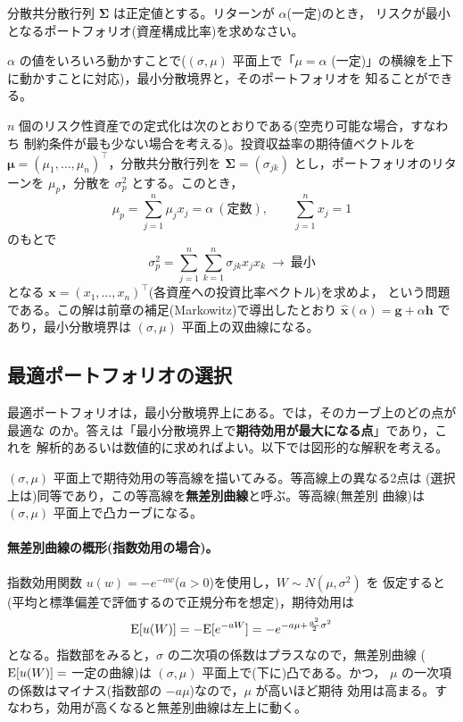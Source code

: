 \begin{keypoint}[平均分散モデルの問題設定]
分散共分散行列 $\bm{\Sigma}$ は正定値とする。リターンが $\alpha$(一定)のとき，
リスクが最小となるポートフォリオ(資産構成比率)を求めなさい。
\end{keypoint}

$\alpha$ の値をいろいろ動かすことで($(\sigma,\mu)$ 平面上で「$\mu=\alpha$
(一定)」の横線を上下に動かすことに対応)，最小分散境界と，そのポートフォリオを
知ることができる。

$n$ 個のリスク性資産での定式化は次のとおりである(空売り可能な場合，すなわち
制約条件が最も少ない場合を考える)。投資収益率の期待値ベクトルを
$\bm{\mu} = (\mu_1,\dots,\mu_n)^\top$，分散共分散行列を
$\bm{\Sigma} = (\sigma_{jk})$ とし，ポートフォリオのリターンを $\mu_p$，分散を
$\sigma_p^2$ とする。このとき，
\[
\mu_p = \sum_{j=1}^n \mu_j x_j = \alpha\ (\text{定数}),\qquad
\sum_{j=1}^n x_j = 1
\]
のもとで
\[
\sigma_p^2 = \sum_{j=1}^{n}\sum_{k=1}^{n}\sigma_{jk}x_j x_k\ \to\ \text{最小}
\]
となる $\bm{x} = (x_1,\dots,x_n)^\top$(各資産への投資比率ベクトル)を求めよ，
という問題である。この解は前章の補足(Markowitz)で導出したとおり
$\hat{\bm{x}}(\alpha) = \bm{g} + \alpha\bm{h}$ であり，最小分散境界は
$(\sigma,\mu)$ 平面上の双曲線になる。

\subsection{最適ポートフォリオの選択}

最適ポートフォリオは，最小分散境界上にある。では，そのカーブ上のどの点が最適な
のか。答えは「最小分散境界上で\textbf{期待効用が最大になる点}」であり，これを
解析的あるいは数値的に求めればよい。以下では図形的な解釈を考える。

$(\sigma,\mu)$ 平面上で期待効用の等高線を描いてみる。等高線上の異なる2点は
(選択上は)同等であり，この等高線を\textbf{無差別曲線}と呼ぶ。等高線(無差別
曲線)は $(\sigma,\mu)$ 平面上で凸カーブになる。

\paragraph{無差別曲線の概形(指数効用の場合)。}
指数効用関数 $u(w) = -e^{-aw}$($a>0$)を使用し，$W\sim N(\mu,\sigma^2)$ を
仮定すると(平均と標準偏差で評価するので正規分布を想定)，期待効用は
\begin{equation}
\mathrm{E}[u(W)] = -\mathrm{E}[e^{-aW}] = -e^{-a\mu + \frac{a^2}{2}\sigma^2}
\end{equation}
となる。指数部をみると，$\sigma$ の二次項の係数はプラスなので，無差別曲線
($\mathrm{E}[u(W)]=$ 一定の曲線)は $(\sigma,\mu)$ 平面上で(下に)凸である。かつ，
$\mu$ の一次項の係数はマイナス(指数部の $-a\mu$)なので，$\mu$ が高いほど期待
効用は高まる。すなわち，効用が高くなると無差別曲線は左上に動く。

